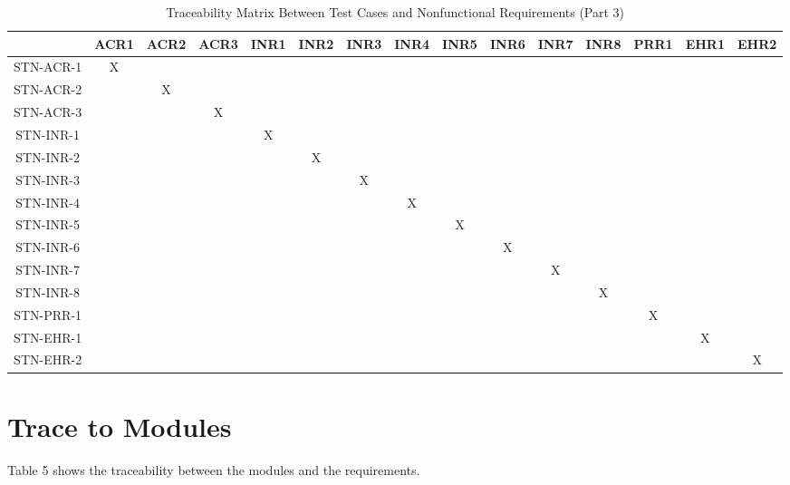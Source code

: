 \documentclass[12pt, titlepage]{article}
\begin{document}
{\begin{landscape}
\begin{table}[h!]
\footnotesize
\centering
\begin{tabular}{|c|c|c|c|c|c|c|c|c|c|c|c|c|c|c|}
 \hline
   & ACR1 & ACR2 & ACR3 & INR1 & INR2 & INR3 & INR4 & INR5 & INR6 & INR7 & INR8 & PRR1 & EHR1 & EHR2 \\
 \hline
 STN-ACR-1 & X & & & & & & & & & & & & & \\
 \hline
 STN-ACR-2 & & X & & & & & & & & & & & & \\
 \hline
 STN-ACR-3 & & & X & & & & & & & & & & & \\
 \hline
 STN-INR-1 & & & & X & & & & & & & & & & \\
 \hline
 STN-INR-2 & & & & & X & & & & & & & & & \\
 \hline
 STN-INR-3 & & & & & & X & & & & & & & & \\
 \hline
 STN-INR-4 & & & & & & & X & & & & & & & \\
 \hline
 STN-INR-5 & & & & & & & & X & & & & & & \\
 \hline
 STN-INR-6 & & & & & & & & & X & & & & & \\
 \hline
 STN-INR-7 & & & & & & & & & & X & & & & \\
 \hline
 STN-INR-8 & & & & & & & & & & & X & & & \\
 \hline
 STN-PRR-1 & & & & & & & & & & & & X & & \\
 \hline
 STN-EHR-1 & & & & & & & & & & & & & X & \\
 \hline
 STN-EHR-2 & & & & & & & & & & & & & & X \\
\hline
\end{tabular}
\caption{Traceability Matrix Between Test Cases and Nonfunctional Requirements (Part 3)}
\label{Table:A_trace}
\end{table}

\end{landscape}
}
\restoregeometry

		
\section{Trace to Modules}	
Table 5 shows the traceability between the modules and the requirements.
\end{document}

